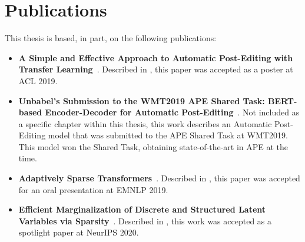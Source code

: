 \section{Publications}
\label{sec:int_publications}

This thesis is based, in part, on the following publications:

\begin{itemize}

      \item {\bf A Simple and Effective Approach to Automatic
            Post-Editing with Transfer Learning}~\citep{Correia2019}.
            Described in , this paper was accepted as a
            poster at ACL 2019.
            
      \item {\bf Unbabel's Submission to the WMT2019 APE Shared Task:
            BERT-based Encoder-Decoder for Automatic
            Post-Editing}~\citep{lopes2019unbabels}. Not included as a specific
            chapter within this thesis, this work describes an Automatic
            Post-Editing model that was submitted to the APE Shared Task at
            WMT2019. This model won the Shared Task, obtaining state-of-the-art
            in APE at the time.
            
      \item {\bf Adaptively Sparse
            Transformers}~\citep{correia2019adaptively}. Described in
            , this paper was accepted for an oral
            presentation at EMNLP 2019.
            
      \item {\bf Efficient Marginalization of Discrete and Structured
            Latent Variables via Sparsity}~\citep{correia2020procneurips}.
            Described in , this work was
            accepted as a spotlight paper at NeurIPS 2020.
            
\end{itemize}